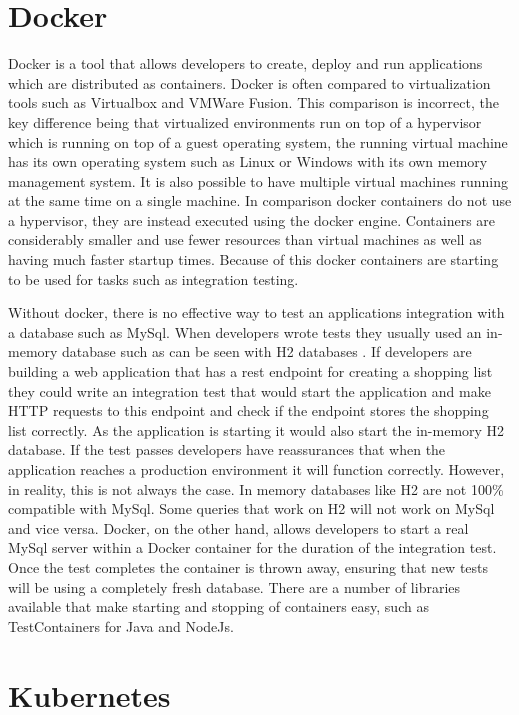 \section{Docker}

Docker is a tool that allows developers to create, deploy and run applications which are distributed as containers. Docker is often compared to virtualization tools such as Virtualbox and VMWare Fusion. This comparison is incorrect, the key difference being that virtualized environments run on top of a hypervisor which is running on top of a guest operating system, the running virtual machine has its own operating system such as Linux or Windows with its own memory management system. It is also possible to have multiple virtual machines running at the same time on a single machine. In comparison docker containers do not use a hypervisor, they are instead executed using the docker engine. Containers are considerably smaller and use fewer resources than virtual machines as well as having much faster startup times. Because of this docker containers are starting to be used for tasks such as integration testing.

Without docker, there is no effective way to test an applications integration with a database such as MySql. When developers wrote tests they usually used an in-memory database such as can be seen with H2 databases \cite{h2db}. If developers are building a web application that has a rest endpoint for creating a shopping list they could write an integration test that would start the application and make HTTP requests to this endpoint and check if the endpoint stores the shopping list correctly. As the application is starting it would also start the in-memory H2 database. If the test passes developers have reassurances that when the application reaches a production environment it will function correctly. However, in reality, this is not always the case. In memory databases like H2 are not 100\% compatible with MySql. Some queries that work on H2 will not work on MySql and vice versa. Docker, on the other hand, allows developers to start a real MySql server within a Docker container for the duration of the integration test. Once the test completes the container is thrown away, ensuring that new tests will be using a completely fresh database. There are a number of libraries available that make starting and stopping of containers easy, such as TestContainers \cite{testcontainers} for Java and NodeJs.

\section{Kubernetes}

